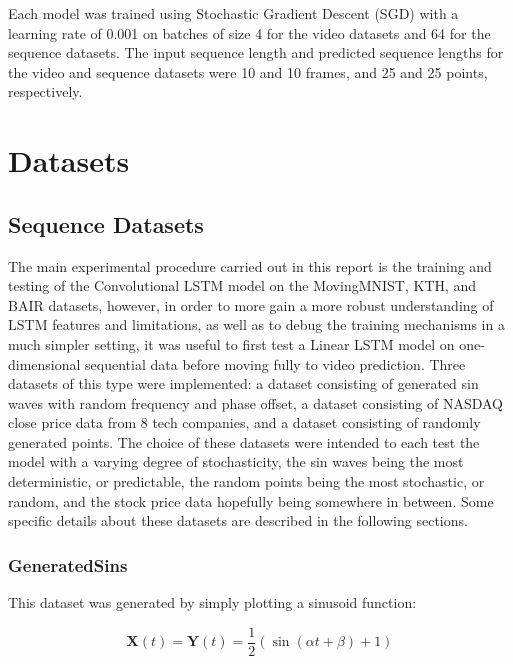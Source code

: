 \documentclass{scrartcl}
\begin{document}
Each model was trained using Stochastic Gradient Descent (SGD) with a learning
rate of 0.001 on batches of size 4 for the video datasets and 64 for the
sequence datasets. The input sequence length and predicted sequence lengths for
the video and sequence datasets were 10 and 10 frames, and 25 and 25 points,
respectively.

\newpage
\section{Datasets}
\label{sec:datasets}

\subsection{Sequence Datasets}
\label{subsec:sequence_datasets}

The main experimental procedure carried out in this report is the training and
testing of the Convolutional LSTM model on the MovingMNIST, KTH, and BAIR
datasets, however, in order to more gain a more robust understanding of LSTM
features and limitations, as well as to debug the training mechanisms in a much
simpler setting, it was useful to first test a Linear LSTM model on
one-dimensional sequential data before moving fully to video prediction. Three
datasets of this type were implemented: a dataset consisting of generated sin
waves with random frequency and phase offset, a dataset consisting of NASDAQ
close price data from 8 tech companies, and a dataset consisting of randomly
generated points. The choice of these datasets were intended to each test the
model with a varying degree of stochasticity, the sin waves being the most
deterministic, or predictable, the random points being the most stochastic, or
random, and the stock price data hopefully being somewhere in between. Some
specific details about these datasets are described in the following sections.

\subsubsection{GeneratedSins}
\label{subsubsec:generatedsins_dataset}

This dataset was generated by simply plotting a sinusoid function:

\begin{equation}
	\boldsymbol{X} (t) = \boldsymbol{Y} (t) = \frac{1}{2} ( \sin (\alpha t + \beta) + 1)
	\label{eq:generated_sins}
\end{equation}
\end{document}
